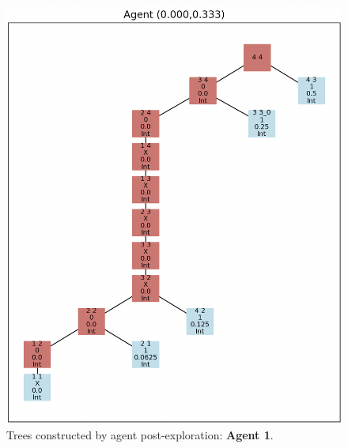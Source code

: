 \begin{figure}[H]
\centering
\includegraphics[width=1\textwidth]{Cap2/agent_1.png}
\caption{Trees constructed by agent post-exploration: \textbf{Agent 1}.}
\label{fig_agent_1_tree}
\end{figure}

